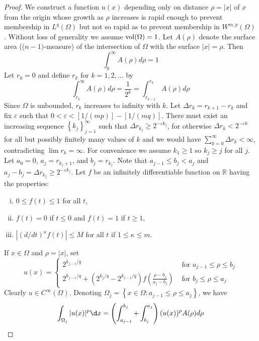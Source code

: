 \begin{proof}
  We construct a function $u(x)$ depending only on distance $\rho=|x|$ of $x$ from the origin whose growth
  as $\rho$ increases is rapid enough to prevent membership in $L^q(\Omega)$ but not so rapid as to prevent 
  membership in $W^{m,p}(\Omega)$.
  Without loss of generality we assume $\operatorname{vol}(\Omega)=1$. Let $A(\rho)$ denote the surface area
  (($n-1)$-measure) of the intersection of $\Omega$ with the surface $|x|=\rho$. Then
  \[
  \int_0^{\infty} A(\rho) d \rho=1
  \]
  Let $r_0=0$ and define $r_k$ for $k=1,2, \ldots$ by
  \[
  \int_{r_k}^{\infty} A(\rho) d \rho=\frac{1}{2^k}=\int_{r_{k-1}}^{r_k} A(\rho) d \rho
  \]
  Since $\Omega$ is unbounded, $r_k$ increases to infinity with $k$. Let $\Delta r_k=r_{k+1}-r_k$
  and fix $\varepsilon$ such that $0<\varepsilon<[1 /(m p)]-[1 /(m q)]$.
  There must exist an increasing sequence $\left\{k_j\right\}_{j=1}^{\infty}$ such that
  $\Delta r_{k_j} \geq 2^{-\varepsilon k_j}$, for otherwise $\Delta r_k<2^{-\varepsilon k}$
  for all but possibly finitely many values of $k$ and we would have $\sum_{k=0}^{\infty} \Delta r_k<\infty$, 
  contradicting $\lim r_k=\infty$. For convenience we assume $k_1 \geq 1$ so $k_j \geq j$ for all $j$.
  Let $a_0=0$, $a_j=r_{k_j+1}$, and $b_j=r_{k_j}$. Note that $a_{j-1} \leq b_j<a_j$
  and $a_j-b_j=\Delta r_{k_j} \geq 2^{-\varepsilon k_j}$.
  Let $f$ be an infinitely differentiable function on $\mathbb{R}$ having the properties:
  \begin{enumerate}[(i)]
    \item $0 \leq f(t) \leq 1$ for all $t$,
    \item $f(t)=0$ if $t \leq 0$ and $f(t)=1$ if $t \geq 1$,
    \item $\left|(d / d t)^\kappa f(t)\right| \leq M$ for all $t$ if $1 \leq \kappa \leq m$.
  \end{enumerate}
  If $x \in \Omega$ and $\rho=|x|$, set
  \[
  u(x)= \begin{cases}2^{k_{j-1} / q} & \text { for } a_{j-1} \leq \rho \leq b_j \\ 2^{k_{j-1} / q}+\left(2^{k_j / q}-2^{k_{j-1} / q}\right) f\left(\frac{\rho-b_j}{a_j-b_j}\right) & \text { for } b_j \leq \rho \leq a_j\end{cases}
  \]
  Clearly $u \in C^{\infty}(\Omega)$. Denoting $\Omega_j=\left\{x \in \Omega: a_{j-1} \leq \rho \leq a_j\right\}$, we have
  \[
  \begin{aligned}
  \int_{\Omega_j}|u(x)|^p \d x & =\left(\int_{a_{j-1}}^{b_j}+\int_{b_j}^{a_j}\right)(u(x))^p A(\rho) d \rho \\

\end{aligned}\]
\end{proof}

